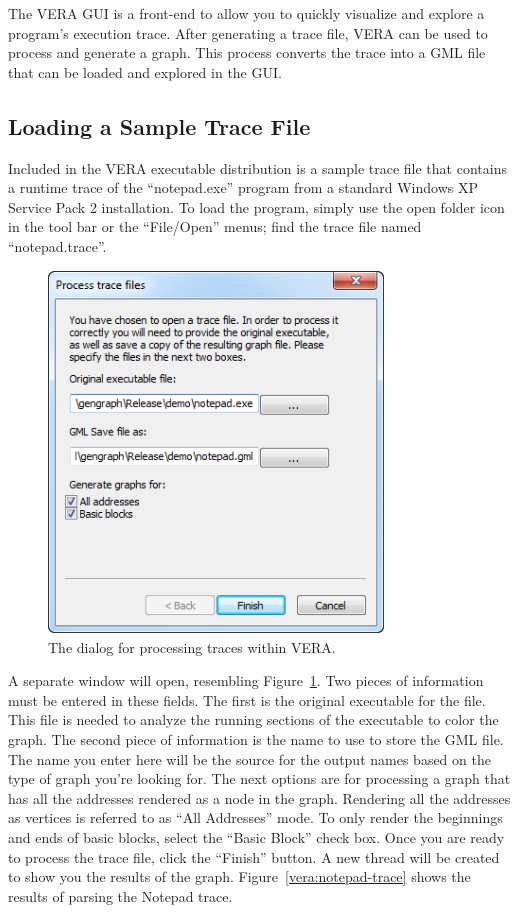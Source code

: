 \documentclass[11pt]{article}
\begin{document}
The VERA GUI is a front-end to allow you to quickly visualize and
explore a program's execution trace. After generating a trace file, VERA can be used to process and generate a graph. This
process converts the trace into a GML file that can be loaded and
explored in the GUI.

\subsection{Loading a Sample Trace File}

Included in the VERA executable distribution is a sample trace file
that contains a runtime trace of the ``notepad.exe'' program from a
standard Windows XP Service Pack 2 installation. To load the program,
simply use the open folder icon in the tool bar or the ``File/Open''
menus; find the trace file named ``notepad.trace''.


\begin{figure}[htb]
  \centering
  \includegraphics[width=3.5in]{vera-trace-dialog.png}
  \caption{The dialog for processing traces within VERA.}\label{vera:trace-gen}
\end{figure}


A separate window will open, resembling
Figure~\ref{vera:trace-gen}. Two pieces of information must be entered
in these fields. The first is the original executable for the
file. This file is needed to analyze the running sections of the
executable to color the graph. The second piece of information is the
name to use to store the GML file. The name you enter here will be the
source for the output names based on the type of graph you're looking
for. The next options are for processing a graph that has all the
addresses rendered as a node in the graph. Rendering all the addresses
as vertices is referred to as ``All Addresses'' mode. To only render the beginnings and ends of basic blocks, select the ``Basic Block'' check box. Once you are ready to process the trace file, click the ``Finish'' button. A new thread will be created to show you the results of the graph. Figure~\ref{vera:notepad-trace} shows the results of parsing the Notepad trace.
\end{document}
